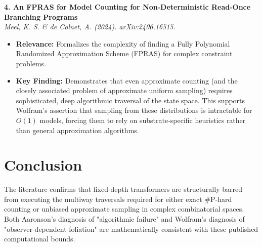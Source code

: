 \documentclass[12pt,a4paper]{article}
\begin{document}
\vspace{1em}
\noindent\textbf{4. An FPRAS for Model Counting for Non-Deterministic Read-Once Branching Programs}\\
\textit{Meel, K. S. \& de Colnet, A. (2024). arXiv:2406.16515.}
\begin{itemize}
    \item \textbf{Relevance:} Formalizes the complexity of finding a Fully Polynomial Randomized Approximation Scheme (FPRAS) for complex constraint problems.
    \item \textbf{Key Finding:} Demonstrates that even approximate counting (and the closely associated problem of approximate uniform sampling) requires sophisticated, deep algorithmic traversal of the state space. This supports Wolfram's assertion that sampling from these distributions is intractable for $O(1)$ models, forcing them to rely on substrate-specific heuristics rather than general approximation algorithms.
\end{itemize}

\section{Conclusion}

The literature confirms that fixed-depth transformers are structurally barred from executing the multiway traversals required for either exact \#P-hard counting or unbiased approximate sampling in complex combinatorial spaces. Both Aaronson's diagnosis of "algorithmic failure" and Wolfram's diagnosis of "observer-dependent foliation" are mathematically consistent with these published computational bounds.
\end{document}
